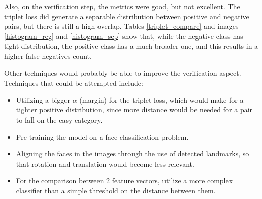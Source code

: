 \documentclass[runningheads]{llncs}
\begin{document}
Also, on the verification step, the metrics were good, but not excellent. The triplet loss did generate a separable distribution between positive and negative pairs, but there is still a high overlap. Tables \ref{triplet_compare} and images \ref{histogram_reg} and \ref{histogram_sep} show that, while the negative class has tight distribution, the positive class has a much broader one, and this results in a higher false negatives count.

Other techniques would probably be able to improve the verification aspect. Techniques that could be attempted include:

\begin{itemize}
    \item Utilizing a bigger $\alpha$ (margin) for the triplet loss, which would make for a tighter positive distribution, since more distance would be needed for a pair to fall on the easy category.
    \item Pre-training the model on a face classification problem.
    \item Aligning the faces in the images through the use of detected landmarks, so that rotation and translation would become less relevant.
    \item For the comparison between 2 feature vectors, utilize a more complex classifier than a simple threshold on the distance between them.
\end{itemize}





\end{document}
